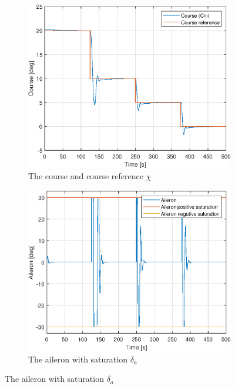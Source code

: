 \begin{figure}[ht]
	\centering
	\begin{subfigure}[b]{0.45\textwidth}
		\includegraphics[width=\textwidth]{figures/2d_chi_course}
		\caption{The course and course reference $\chi$}
		\label{fig:2d_chi_course}
	\end{subfigure}
	\begin{subfigure}[b]{0.45\textwidth}
		\includegraphics[width=\textwidth]{figures/2d_delta_a_aileron}
		\caption{The aileron with saturation $\delta_a$}
		\label{fig:2d_delta_a_aileron}
	\end{subfigure}
\end{figure}

